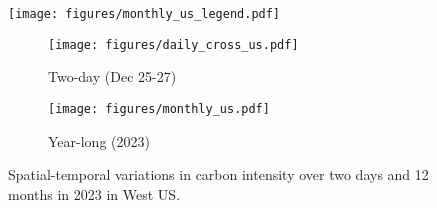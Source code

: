 \begin{figure}[t]
    \centering%
    \texttt{[image: figures/monthly\_us\_legend.pdf]}\\
    \begin{subfigure}{0.45\linewidth}%
    \centering%
    \captionsetup{justification=centering}
    \texttt{[image: figures/daily\_cross\_us.pdf]}
    \caption{Two-day (Dec 25-27)}
    \label{fig:carbon_intensity_temporal_days_WUS}
    \end{subfigure}
    \quad
    \begin{subfigure}{0.45\linewidth}%
    \centering%
    \captionsetup{justification=centering}
    \texttt{[image: figures/monthly\_us.pdf]}
    \caption{Year-long (2023)} 
    \label{fig:carbon_intensity_temporal_months_WUS}
    \end{subfigure}
    \caption{Spatial-temporal variations in carbon intensity over two days and 12 months in 2023 in West US.}
    \label{fig:carbon_intensity_temporal}
\end{figure}



